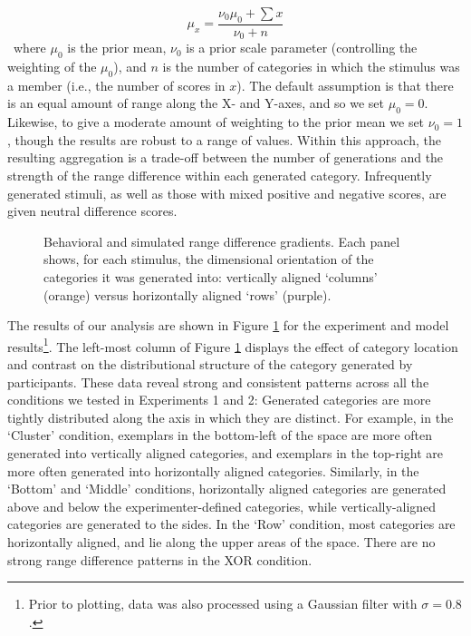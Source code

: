 \documentclass[12pt]{article}
\newcommand\inputpgf[2]{{
\let\pgfimageWithoutPath\pgfimage
\renewcommand{\pgfimage}[2][]{\pgfimageWithoutPath[##1]{#1/##2}}

}}
\begin{document}
\begin{flushleft}
\begin{equation}
\mu_x = \dfrac
    { \nu_0 \mu_0 + \sum{x} } 
    { \nu_0 + n }
\label{eq:rangediff-bayes}
\end{equation}
\
where $\mu_0$ is the prior mean, $\nu_0$ is a prior scale parameter (controlling the weighting of the $\mu_0$), and $n$ is the number of categories in which the stimulus was a member (i.e., the number of scores in $x$). The default assumption is that there is an equal amount of range along the X- and Y-axes, and so we set $\mu_0 = 0$. Likewise, to give a moderate amount of weighting to the prior mean we set $\nu_0 = 1$, though the results are robust to a range of values. Within this approach, the resulting aggregation is a trade-off between the number of generations and the strength of the range difference within each generated category. Infrequently generated stimuli, as well as those with mixed positive and negative scores, are given neutral difference scores.

\begin{figure}[p]
    \begin{center}
    \inputpgf{figs/}{range-diff-gradients.pgf}
    \caption{Behavioral and simulated range difference gradients. Each panel shows, for each stimulus, the dimensional orientation of the categories it was generated into: vertically aligned `columns' (orange) versus horizontally aligned `rows' (purple).}
    \label{fig:range-diff-gradients}
    \end{center}
\end{figure}

The results of our analysis are shown in Figure \ref{fig:range-diff-gradients} for the experiment and model results\footnote{Prior to plotting, data was also processed using a Gaussian filter with $\sigma = 0.8$.}. The left-most column of Figure \ref{fig:range-diff-gradients} displays the effect of category location and contrast on the distributional structure of the category generated by participants. These data reveal strong and consistent patterns across all the conditions we tested in Experiments 1 and 2: Generated categories are more tightly distributed along the axis in which they are distinct. For example, in the `Cluster' condition, exemplars in the bottom-left of the space are more often generated into vertically aligned categories, and exemplars in the top-right are more often generated into horizontally aligned categories. Similarly, in the `Bottom' and `Middle' conditions, horizontally aligned categories are generated above and below the experimenter-defined categories, while vertically-aligned categories are generated to the sides. In the `Row' condition, most categories are horizontally aligned, and lie along the upper areas of the space. There are no strong range difference patterns in the XOR condition.


\end{flushleft}
\end{document}
